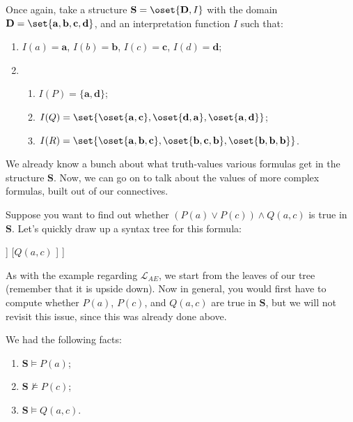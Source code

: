 Once again, take a structure $\mathbf{S}=\oset{\mathbf{D}, I}$ with the domain $\mathbf{D}=\set{\mathbf{a}, \mathbf{b}, \mathbf{c}, \mathbf{d}}$, and an interpretation function $I$ such that:

\begin{enumerate}
	\item $I(a)=\mathbf{a}$, $I(b)=\mathbf{b}$, $I(c)=\mathbf{c}$, $I(d)=\mathbf{d}$; 
	\item 
	\begin{enumerate}
		\item $I(P)=\{\mathbf{a}, \mathbf{d}\}$;
		\item $I(Q)=\set{\oset{\mathbf{a}, \mathbf{c}}, \oset{\mathbf{d}, \mathbf{a}}, \oset{\mathbf{a}, \mathbf{d}}}$;
		\item $I(R)=\set{\oset{\mathbf{a}, \mathbf{b}, \mathbf{c}}, \oset{\mathbf{b}, \mathbf{c}, \mathbf{b}}, \oset{\mathbf{b}, \mathbf{b}, \mathbf{b}}}$.
	\end{enumerate} 
\end{enumerate}

We already know a bunch about what truth-values various formulas get in the structure $\mathbf{S}$. Now, we can go on to talk about the values of more complex formulas, built out of our connectives. 

Suppose you want to find out whether $(P(a) \vee P(c)) \wedge Q(a, c)$ is true in $\mathbf{S}$. Let's quickly draw up a syntax tree for this formula:

\begin{center}
\begin{forest}
[{$(P(a) \vee P(c)) \wedge Q(a, c)$}
	[{$P(a) \vee P(c)$}
		[{$P(a)$}
		]
		[{$P(c)$}
		]
	]
	[${Q(a, c)}$
	]
]
\end{forest}
\end{center}

As with the example regarding $\mathcal{L}_{AE}$, we start from the leaves of our tree (remember that it is upside down). Now in general, you would first have to compute whether $P(a)$, $P(c)$, and $Q(a, c)$ are true in $\mathbf{S}$, but we will not revisit this issue, since this was already done above. 

We had the following facts:

\begin{enumerate}
	\item $\mathbf{S} \models P(a)$;
	\item $\mathbf{S} \not\models P(c)$;
	\item $\mathbf{S} \models Q(a, c)$.
\end{enumerate}

